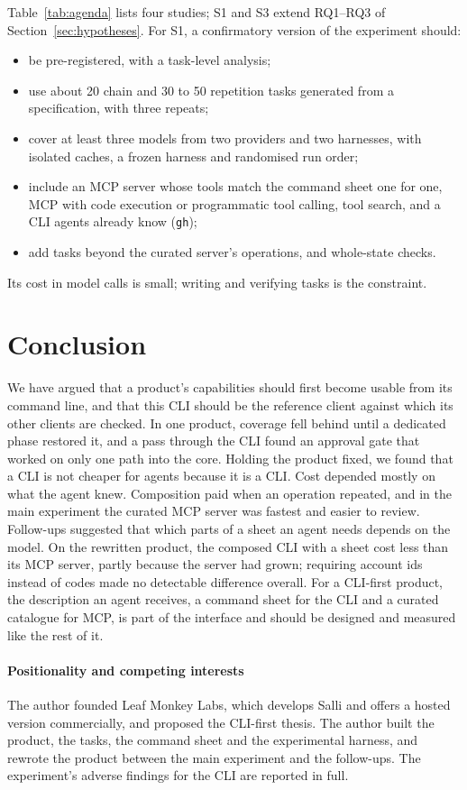 \documentclass[sigconf,nonacm]{acmart}
\newcommand{\sysA}{Salli}
\newcommand{\cmd}[1]{\texttt{#1}}
\begin{document}
Table~\ref{tab:agenda} lists four studies; S1 and S3 extend RQ1--RQ3 of Section~\ref{sec:hypotheses}. For S1, a confirmatory version of the experiment should:
\begin{itemize}
\item be pre-registered, with a task-level analysis;
\item use about 20 chain and 30 to 50 repetition tasks generated from a specification, with three repeats;
\item cover at least three models from two providers and two harnesses, with isolated caches, a frozen harness and randomised run order;
\item include an MCP server whose tools match the command sheet one for one, MCP with code execution or programmatic tool calling, tool search, and a CLI agents already know (\cmd{gh});
\item add tasks beyond the curated server's operations, and whole-state checks.
\end{itemize}
Its cost in model calls is small; writing and verifying tasks is the constraint.


\section{Conclusion}
We have argued that a product's capabilities should first become usable from its command line, and that this CLI should be the reference client against which its other clients are checked. In one product, coverage fell behind until a dedicated phase restored it, and a pass through the CLI found an approval gate that worked on only one path into the core. Holding the product fixed, we found that a CLI is not cheaper for agents because it is a CLI. Cost depended mostly on what the agent knew. Composition paid when an operation repeated, and in the main experiment the curated MCP server was fastest and easier to review. Follow-ups suggested that which parts of a sheet an agent needs depends on the model. On the rewritten product, the composed CLI with a sheet cost less than its MCP server, partly because the server had grown; requiring account ids instead of codes made no detectable difference overall. For a CLI-first product, the description an agent receives, a command sheet for the CLI and a curated catalogue for MCP, is part of the interface and should be designed and measured like the rest of it.

\paragraph{Positionality and competing interests}
The author founded Leaf Monkey Labs, which develops \sysA{} and offers a hosted version commercially, and proposed the CLI-first thesis. The author built the product, the tasks, the command sheet and the experimental harness, and rewrote the product between the main experiment and the follow-ups. The experiment's adverse findings for the CLI are reported in full.
\end{document}
